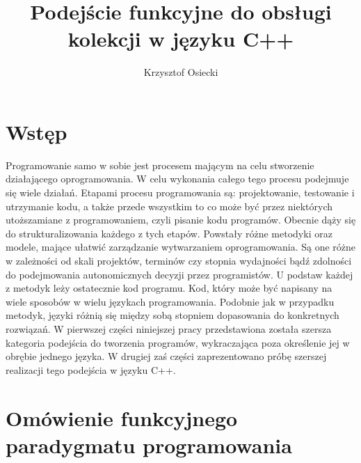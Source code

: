 \documentclass[a4paper,10pt]{report}
\title{Podejście funkcyjne do obsługi kolekcji w języku C++}
\author{Krzysztof Osiecki}
\begin{document}
\pagestyle{fancy}\lhead{}\rightmark

\maketitle
\tableofcontents{}
\chapter*{Wstęp}
Programowanie samo w sobie jest procesem mającym na celu stworzenie działającego oprogramowania. W celu wykonania całego tego procesu podejmuje się wiele działań. Etapami procesu programowania są: projektowanie, testowanie i utrzymanie kodu, a także przede wszystkim to co może być przez niektórych utoższamiane z programowaniem, czyli pisanie kodu programów. Obecnie dąży się do strukturalizowania każdego z tych etapów. Powstały różne metodyki oraz modele, mające ułatwić zarządzanie wytwarzaniem oprogramowania. Są one różne w zależności od skali projektów, terminów czy stopnia wydajności bądź zdolności do podejmowania autonomicznych decyzji przez programistów. U podstaw każdej z metodyk leży ostatecznie kod programu. Kod, który może być napisany na wiele sposobów w wielu językach programowania. Podobnie jak w przypadku metodyk, języki różnią się między sobą stopniem dopasowania do konkretnych rozwiązań. W pierwszej części niniejszej pracy przedstawiona została szersza kategoria podejścia do tworzenia programów, wykraczająca poza określenie jej w obrębie jednego języka. W drugiej zaś części zaprezentowano próbę szerszej realizacji tego podejścia w języku C++.
\chapter{Omówienie funkcyjnego paradygmatu programowania}
\end{document}
